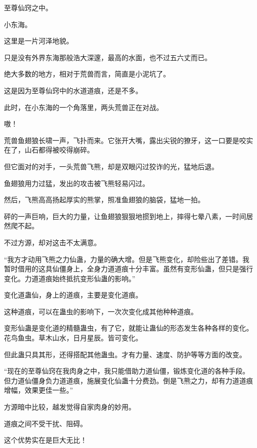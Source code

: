 
\begin{this_body}



至尊仙窍之中。

小东海。

这里是一片河泽地貌。

只是没有外界东海那般浩大深邃，最高的水面，也不过五六丈而已。

绝大多数的地方，相对于荒兽而言，简直是小泥坑了。

这是因为至尊仙窍中的水道道痕，还是不多。

此时，在小东海的一个角落里，两头荒兽正在对战。

嗷！

荒兽鱼翅狼长啸一声，飞扑而来。它张开大嘴，露出尖锐的獠牙，这一口要是咬实在了，山石都得被咬得崩碎。

但它面对的对手，一头荒兽飞熊，却是双眼闪过狡诈的光，猛地后退。

鱼翅狼用力过猛，发出的攻击被飞熊轻易闪过。

然后，飞熊高高扬起厚实的熊掌，照准鱼翅狼的脑袋，猛地一拍。

砰的一声巨响，巨大的力量，让鱼翅狼狠狠地掼到地上，摔得七晕八素，一时间居然爬不起。

不过方源，却对这击不太满意。

“我方才动用飞熊之力仙蛊，力量的确大增。但是飞熊变化，却险些出了差错。我暂时借用的这具仙僵身上，全身力道道痕十分丰富。虽然有变形仙蛊，但只是强行变化。力道道痕始终抵抗变形仙蛊的影响。”

变化道蛊仙，身上的道痕，主要是变化道痕。

这种道痕，可以在蛊虫的影响下，一次次变化成其他种种道痕。

变形仙蛊是变化道的精髓蛊虫，有了它，就能让蛊仙的形态发生各种各样的变化。花鸟鱼虫。草木山水，日月星辰。皆可变化。

但此蛊只具其形，还得搭配其他蛊虫。才有力量、速度、防护等等方面的改变。

“现在的至尊仙窍在我肉身之中，我只能借助力道仙僵，锻炼变化道的各种手段。但力道仙僵身负力道道痕，施展变化仙蛊十分费劲。倒是飞熊之力，却有力道道痕增幅，效果更佳一些。”

方源暗中比较，越发觉得自家肉身的妙用。

道痕之间不受干扰、阻碍。

这个优势实在是巨大无比！


\end{this_body}
